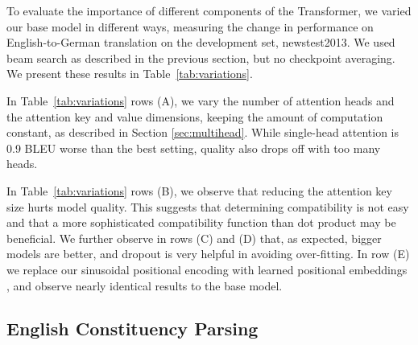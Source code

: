 \documentclass{article}
\begin{document}
To evaluate the importance of different components of the Transformer, we varied our base model in different ways, measuring the change in performance on English-to-German translation on the development set, newstest2013. We used beam search as described in the previous section, but no checkpoint averaging.  We present these results in Table~\ref{tab:variations}.  

In Table~\ref{tab:variations} rows (A), we vary the number of attention heads and the attention key and value dimensions, keeping the amount of computation constant, as described in Section \ref{sec:multihead}. While single-head attention is 0.9 BLEU worse than the best setting, quality also drops off with too many heads.

In Table~\ref{tab:variations} rows (B), we observe that reducing the attention key size  hurts model quality. This suggests that determining compatibility is not easy and that a more sophisticated compatibility function than dot product may be beneficial. We further observe in rows (C) and (D) that, as expected, bigger models are better, and dropout is very helpful in avoiding over-fitting.  In row (E) we replace our sinusoidal positional encoding with learned positional embeddings \citep{JonasFaceNet2017}, and observe nearly identical results to the base model.






\subsection{English Constituency Parsing}
\end{document}
